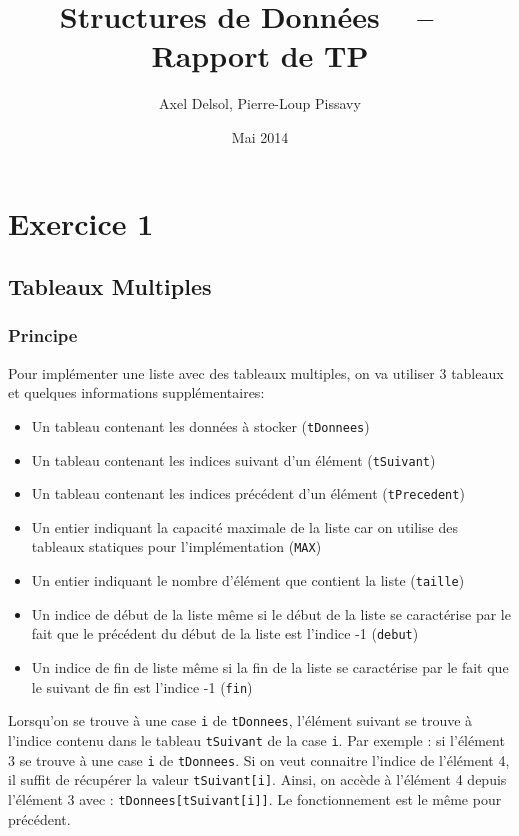 \documentclass{report}
\title{Structures de Données ~ -- ~ Rapport de TP}
\author{Axel Delsol, Pierre-Loup Pissavy}
\date{Mai 2014}
\newcommand{\code}{\lstinline[style=customjava]}
\begin{document}
  \maketitle
  \tableofcontents
  
  \setlength{\parskip}{12pt}
  \chapter*{Exercice 1}
  \addtocounter{chapter}{1}
    \section{Tableaux Multiples}
      \subsection{Principe}
        Pour implémenter une liste avec des tableaux multiples, on va utiliser 3 tableaux et quelques informations supplémentaires: 
        \begin{itemize}
          \item Un tableau contenant les données à stocker (\code{tDonnees})
          \item Un tableau contenant les indices suivant d'un élément (\code{tSuivant})
          \item Un tableau contenant les indices précédent d'un élément (\code{tPrecedent})
          \item Un entier indiquant la capacité maximale de la liste car on utilise des tableaux statiques pour l'implémentation (\code{MAX})
          \item Un entier indiquant le nombre d'élément que contient la liste (\code{taille})
          \item Un indice de début de la liste même si le début de la liste se caractérise par le fait que le précédent du début de la liste est l'indice -1 (\code{debut})
          \item Un indice de fin de liste même si la fin de la liste se caractérise par le fait que le suivant de fin est l'indice -1 (\code{fin})
        \end{itemize}
        Lorsqu'on se trouve à une case \code{i} de \code{tDonnees}, l'élément suivant se trouve à l'indice contenu dans le tableau \code{tSuivant} de la case \code{i}.
        Par exemple : si l'élément 3 se trouve à une case \code{i} de \code{tDonnees}. Si on veut connaitre l'indice de l'élément 4, il suffit de récupérer la valeur \code{tSuivant[i]}. Ainsi, on accède à l'élément 4 depuis l'élément 3 avec : \code{tDonnees[tSuivant[i]]}.
        Le fonctionnement est le même pour précédent.
        
\end{document}
